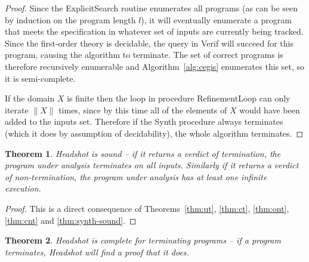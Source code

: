 \documentclass[preprint]{sigplanconf}
\newtheorem{theorem}{Theorem}
\theoremstyle{definition}
\begin{document}
\begin{proof}
 Since the {\sc ExplicitSearch} routine enumerates all programs (as can be seen by induction on
 the program length $l$), it will eventually enumerate a program that meets the specification
 in whatever set of inputs are currently being tracked.  Since the first-order theory is
 decidable, the query in {\sc Verif} will succeed for this program, causing the algorithm to terminate.
 The set of correct programs is therefore recursively enumerable and Algorithm~\ref{alg:cegis}
 enumerates this set, so it is semi-complete.

 If the domain $X$ is finite then the loop in procedure {\sc RefinementLoop} can only
 iterate $\| X \|$ times, since by this time all of the elements of $X$ would have been
 added to the inputs set.  Therefore if the {\sc Synth} procedure always terminates (which it does
 by assumption of decidability), the whole algorithm terminates.
\end{proof}


\begin{theorem}
\label{thm:sound}
 {\sc Headshot} is sound -- if it returns a verdict of termination, the program under
 analysis terminates on all inputs.  Similarly if it returns a verdict of non-termination,
 the program under analysis has at least one infinite execution.
\end{theorem}

\begin{proof}
 This is a direct consequence of Theorems~\ref{thm:ut}, \ref{thm:ct}, \ref{thm:ont}, \ref{thm:cnt} and \ref{thm:synth-sound}.
\end{proof}

\begin{theorem}
\label{thm:complete-termination}
 {\sc Headshot} is complete for terminating programs -- if a program terminates, {\sc Headshot} will find a proof that it does.
\end{theorem}
\end{document}

